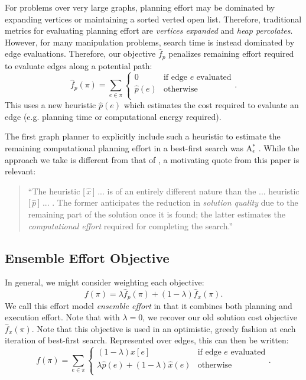 For problems over very large graphs,
planning effort may be dominated by expanding vertices
or maintaining a sorted verted open list.
Therefore, traditional metrics for evaluating planning
effort are \emph{vertices expanded}
and \emph{heap percolates}.
However, for many manipulation problems,
search time is instead dominated by edge evaluations.
Therefore, our objective $\hat{f}_p$
penalizes remaining effort required to evaluate edges
along a potential path:
\begin{equation}
   \hat{f}_p(\pi) = \sum_{e \in \pi} \left\{
   \begin{array}{cl}
      0 & \mbox{if edge } e \mbox{ evaluated}  \\
      \hat{p}(e) & \mbox{otherwise} \\
   \end{array}
   \right.
   .
\end{equation}
This uses a new heuristic $\hat{p}(e)$ which estimates the cost
required to evaluate an edge
(e.g. planning time or computational energy required).

The first graph planner to explicitly include such a heuristic
to estimate the remaining
computational planning effort in a best-first search
was A$_\epsilon^*$ \cite{pearl1982semiadmissible}.
While the approach we take is different from that of
\cite{pearl1982semiadmissible},
a motivating quote from this paper is relevant:
\begin{quote}
``The heuristic [\,$\hat{x}$\,] ... is of an entirely
different nature than the ... heuristic [\,$\hat{p}$\,] ... .
The former anticipates the reduction in \emph{solution quality} due to the
remaining part of the solution once it is found;
the latter estimates the \emph{computational effort}
required for completing the search.''
\end{quote}

\subsection{Ensemble Effort Objective}

In general, we might consider weighting each objective:
\begin{equation}
   f(\pi) = \lambda \hat{f}_p(\pi) + (1 - \lambda) \hat{f}_x(\pi) .
   \label{eqn:general-objective}
\end{equation}
We call this effort model
\emph{ensemble effort}
in that it combines both planning and execution effort.
Note that with $\lambda=0$,
we recover our old solution cost objective $\hat{f}_x(\pi)$.
Note that this objective is used in an optimistic, greedy fashion at each
iteration of best-first search.
Represented over edges,
this can then be written:
\begin{equation}
   f(\pi) = \sum_{e \in \pi} \left\{
   \begin{array}{cl}
      (1 - \lambda) x[e] & \mbox{if edge } e \mbox{ evaluated}  \\
      \lambda \hat{p}(e) + (1 - \lambda) \hat{x}(e) & \mbox{otherwise} \\
   \end{array}
   \right.
   .
   \label{eqn:general-objective-explicit}
\end{equation}

